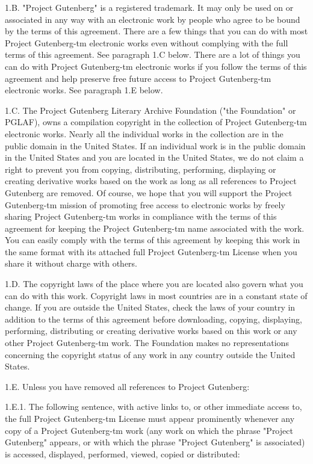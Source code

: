 1.B.  "Project Gutenberg" is a registered trademark.  It may only be
used on or associated in any way with an electronic work by people who
agree to be bound by the terms of this agreement.  There are a few
things that you can do with most Project Gutenberg-tm electronic works
even without complying with the full terms of this agreement.  See
paragraph 1.C below.  There are a lot of things you can do with Project
Gutenberg-tm electronic works if you follow the terms of this agreement
and help preserve free future access to Project Gutenberg-tm electronic
works.  See paragraph 1.E below.

1.C.  The Project Gutenberg Literary Archive Foundation ("the Foundation"
or PGLAF), owns a compilation copyright in the collection of Project
Gutenberg-tm electronic works.  Nearly all the individual works in the
collection are in the public domain in the United States.  If an
individual work is in the public domain in the United States and you are
located in the United States, we do not claim a right to prevent you from
copying, distributing, performing, displaying or creating derivative
works based on the work as long as all references to Project Gutenberg
are removed.  Of course, we hope that you will support the Project
Gutenberg-tm mission of promoting free access to electronic works by
freely sharing Project Gutenberg-tm works in compliance with the terms of
this agreement for keeping the Project Gutenberg-tm name associated with
the work.  You can easily comply with the terms of this agreement by
keeping this work in the same format with its attached full Project
Gutenberg-tm License when you share it without charge with others.

1.D.  The copyright laws of the place where you are located also govern
what you can do with this work.  Copyright laws in most countries are in
a constant state of change.  If you are outside the United States, check
the laws of your country in addition to the terms of this agreement
before downloading, copying, displaying, performing, distributing or
creating derivative works based on this work or any other Project
Gutenberg-tm work.  The Foundation makes no representations concerning
the copyright status of any work in any country outside the United
States.

1.E.  Unless you have removed all references to Project Gutenberg:

1.E.1.  The following sentence, with active links to, or other immediate
access to, the full Project Gutenberg-tm License must appear prominently
whenever any copy of a Project Gutenberg-tm work (any work on which the
phrase "Project Gutenberg" appears, or with which the phrase "Project
Gutenberg" is associated) is accessed, displayed, performed, viewed,
copied or distributed:

